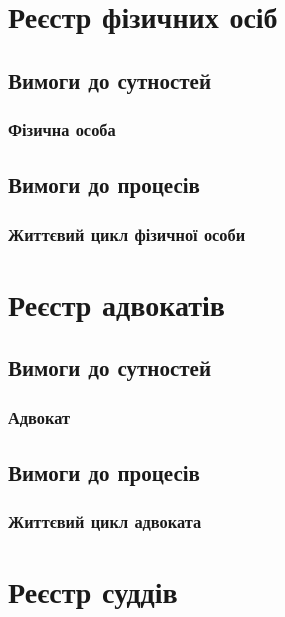 \documentclass{article}
\begin{document}
\newpage
\section{Реєстр фізичних осіб}

\subsection{Вимоги до сутностей}

\subsubsection{Фізична особа}

\subsection{Вимоги до процесів}

\subsubsection{Життєвий цикл фізичної особи}

\newpage
\section{Реєстр адвокатів}

\subsection{Вимоги до сутностей}

\subsubsection{Адвокат}

\subsection{Вимоги до процесів}

\subsubsection{Життєвий цикл адвоката}

\newpage
\section{Реєстр суддів}
\end{document}
